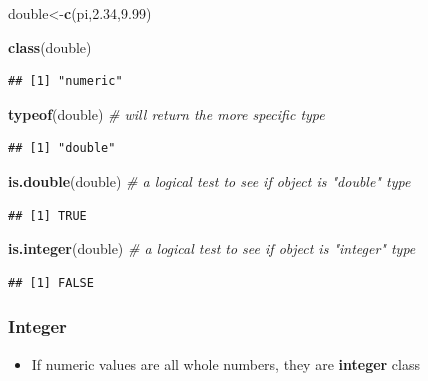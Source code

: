 \documentclass[]{book}
\newenvironment{Shaded}{\begin{snugshade}}{\end{snugshade}}
\newcommand{\KeywordTok}[1]{\textcolor[rgb]{0.13,0.29,0.53}{\textbf{#1}}}
\newcommand{\FloatTok}[1]{\textcolor[rgb]{0.00,0.00,0.81}{#1}}
\newcommand{\CommentTok}[1]{\textcolor[rgb]{0.56,0.35,0.01}{\textit{#1}}}
\newcommand{\NormalTok}[1]{#1}
\providecommand{\tightlist}{%
  \setlength{\itemsep}{0pt}\setlength{\parskip}{0pt}}
\theoremstyle{definition}
\theoremstyle{definition}
\theoremstyle{definition}
\theoremstyle{remark}
\begin{document}
\begin{Shaded}
\begin{Highlighting}[]
\NormalTok{double<-}\KeywordTok{c}\NormalTok{(pi,}\FloatTok{2.34}\NormalTok{,}\FloatTok{9.99}\NormalTok{)}

\KeywordTok{class}\NormalTok{(double)}
\end{Highlighting}
\end{Shaded}

\begin{verbatim}
## [1] "numeric"
\end{verbatim}

\begin{Shaded}
\begin{Highlighting}[]
\KeywordTok{typeof}\NormalTok{(double) }\CommentTok{# will return the more specific type }
\end{Highlighting}
\end{Shaded}

\begin{verbatim}
## [1] "double"
\end{verbatim}

\begin{Shaded}
\begin{Highlighting}[]
\KeywordTok{is.double}\NormalTok{(double) }\CommentTok{# a logical test to see if object is "double" type}
\end{Highlighting}
\end{Shaded}

\begin{verbatim}
## [1] TRUE
\end{verbatim}

\begin{Shaded}
\begin{Highlighting}[]
\KeywordTok{is.integer}\NormalTok{(double) }\CommentTok{# a logical test to see if object is "integer" type}
\end{Highlighting}
\end{Shaded}

\begin{verbatim}
## [1] FALSE
\end{verbatim}

\subsubsection{Integer}\label{integer}

\begin{itemize}
\tightlist
\item
  If numeric values are all whole numbers, they are \textbf{integer}
  class
\end{itemize}
\end{document}
